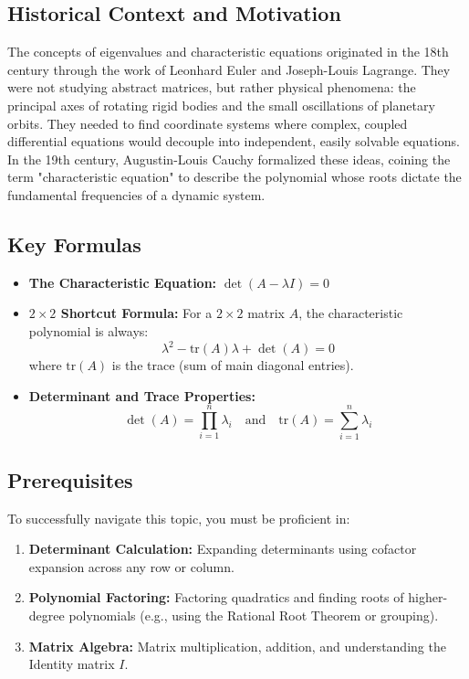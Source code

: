 \documentclass[11pt, a4paper]{article}
\theoremstyle{definition}
\theoremstyle{remark}
\begin{document}
\subsection{Historical Context and Motivation}
The concepts of eigenvalues and characteristic equations originated in the 18th century through the work of Leonhard Euler and Joseph-Louis Lagrange. They were not studying abstract matrices, but rather physical phenomena: the principal axes of rotating rigid bodies and the small oscillations of planetary orbits. They needed to find coordinate systems where complex, coupled differential equations would decouple into independent, easily solvable equations. In the 19th century, Augustin-Louis Cauchy formalized these ideas, coining the term "characteristic equation" to describe the polynomial whose roots dictate the fundamental frequencies of a dynamic system.

\subsection{Key Formulas}
\begin{itemize}
    \item \textbf{The Characteristic Equation:} $\displaystyle \det(A - \lambda I) = 0$
    \item \textbf{$2 \times 2$ Shortcut Formula:} For a $2 \times 2$ matrix $A$, the characteristic polynomial is always:
    \[ \lambda^2 - \text{tr}(A)\lambda + \det(A) = 0 \]
    where $\text{tr}(A)$ is the trace (sum of main diagonal entries).
    \item \textbf{Determinant and Trace Properties:} 
    \[ \det(A) = \prod_{i=1}^{n} \lambda_i \quad \text{and} \quad \text{tr}(A) = \sum_{i=1}^{n} \lambda_i \]
\end{itemize}

\subsection{Prerequisites}
To successfully navigate this topic, you must be proficient in:
\begin{enumerate}
    \item \textbf{Determinant Calculation:} Expanding determinants using cofactor expansion across any row or column.
    \item \textbf{Polynomial Factoring:} Factoring quadratics and finding roots of higher-degree polynomials (e.g., using the Rational Root Theorem or grouping).
    \item \textbf{Matrix Algebra:} Matrix multiplication, addition, and understanding the Identity matrix $I$.
\end{enumerate}
\end{document}
